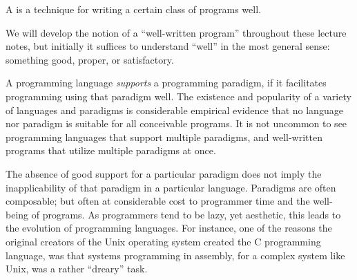 \begin{definition}

A  is a technique for writing a certain class of
programs well.

\end{definition}

We will develop the notion of a ``well-written program'' throughout these
lecture notes, but initially it suffices to understand ``well'' in the most
general sense: something good, proper, or satisfactory.

A programming language \emph{supports} a programming paradigm, if it
facilitates programming using that paradigm well. The existence and popularity
of a variety of languages and paradigms is considerable empirical evidence that
no language nor paradigm is suitable for all conceivable programs. It is not
uncommon to see programming languages that support multiple paradigms, and
well-written programs that utilize multiple paradigms at once.

The absence of good support for a particular paradigm does not imply the
inapplicability of that paradigm in a particular language.  Paradigms are often
composable; but often at considerable cost to programmer time and the
well-being of programs. As programmers tend to be lazy, yet aesthetic, this
leads to the evolution of programming languages. For instance, one of the
reasons the original creators of the Unix operating system created the C
programming language, was that systems programming in assembly, for a complex
system like Unix, was a rather ``dreary'' task\cite{the-development-of-c}.


